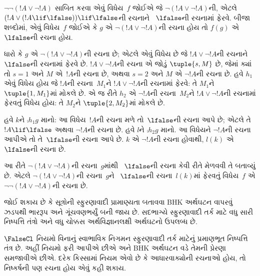 \begin{ex}
$\lnot \lnot (!A \lor \lnot !A)$ સાબિત કરવા એવું વિધેય~$f$
જોઈએ જે $\lnot(!A \lor \lnot !A)$ની, એટલે
$(!A \lor (!A \lif \lfalse)) \lif \lfalse$ની રચનાને
~$\lfalse$ની રચનામાં ફેરવે. બીજા શબ્દોમાં, એવું વિધેય~$f$
જોઈએ કે $g$ એ $\lnot(!A \lor \lnot !A)$ની રચના હોય તો
$f(g)$ એ~$\lfalse$ની રચના હોય.

ધારો કે $g$ એ $\lnot(!A \lor \lnot !A)$ની રચના છે; એટલે
એવું વિધેય છે જે $!A \lor \lnot !A$ની રચનાને~$\lfalse$ની
રચનામાં ફેરવે છે. $!A \lor \lnot !A$ની રચના એ જોડું
$\tuple{s, M}$ છે, જેમાં ક્યાં તો $s = 1$ અને $M$
એ~$!A$ની રચના છે, અથવા $s = 2$ અને $M$ એ $\lnot !A$ની
રચના છે. હવે $h_1$ એવું વિધેય હોય જે $!A$ની રચના~$M_1$ને
$!A \lor \lnot !A$ની રચનામાં ફેરવે: તે $M_1$ને
$\tuple{1, M_1}$માં મોકલે છે.
એ જ રીતે $h_2$ એ $\lnot !A$ની રચના~$M_2$ને
$!A \lor \lnot !A$ની રચનામાં ફેરવતું વિધેય હોય: તે
$M_2$ને $\tuple{2, M_2}$માં મોકલે છે.

હવે $k$ને $\comp{h_1}{g}$ માનો: આ વિધેય~$!A$ની રચના
મળે તો~$\lfalse$ની રચના આપે છે; એટલે તે $!A \lif \lfalse$
અથવા $\lnot !A$ની રચના છે. હવે $l$ને $\comp{h_2}{g}$
માનો. આ વિધેયને $\lnot !A$ની રચના આપીએ તો તે~$\lfalse$ની
રચના આપે છે. $k$ એ $\lnot !A$ની રચના હોવાથી, $l(k)$
એ~$\lfalse$ની રચના છે.

આ રીતે $\lnot(!A \lor \lnot !A)$ની રચના~$g$માંથી
~$\lfalse$ની રચના કેવી રીતે મેળવવી તે બતાવ્યું છે.
એટલે $\lnot(!A \lor \lnot !A)$ની રચના~$g$ને
~$\lfalse$ની રચના~$l(k)$માં ફેરવતું વિધેય~$f$ એ
$\lnot\lnot(!A \lor \lnot !A)$ની રચના છે.
\end{ex}

જોઈ શકાય છે કે સૂત્રોની સ્ફુરણાવાદી પ્રામાણ્યતા
બતાવવા BHK અર્થઘટન વાપરવું ઝડપથી ભારરૂપ અને ગૂંચવણભર્યું
બની જાય છે. સદભાગ્યે સ્ફુરણાવાદી તર્ક માટે વધુ સારી
નિષ્પત્તિ તંત્રો અને વધુ ચોક્કસ અર્થવિજ્ઞાનલક્ષી
અર્થઘટનો ઉપલબ્ધ છે.
\endgroup


\begingroup
\makeatletter{}\makeatother


\label{guunit:OLP-0496}


$\FalseCl$ નિયમો વિનાનું સ્વાભાવિક નિગમન સ્ફુરણાવાદી તર્ક
માટેનું પ્રમાણભૂત નિષ્પત્તિ તંત્ર છે. અહીં નિયમો ફરી
આપીએ છીએ અને BHK અર્થઘટન વડે તેમની પ્રેરણા સમજાવીએ છીએ.
દરેક કિસ્સામાં નિયમ એવો છે કે આધારવાક્યોની રચનાઓ હોય, તો
નિષ્કર્ષની પણ રચના હોય એવું કહી શકાય.


